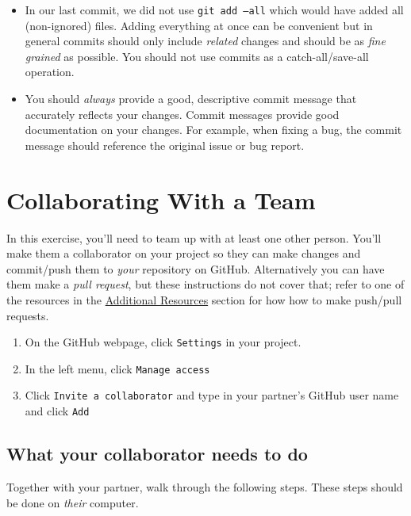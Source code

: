 \documentclass[12pt]{scrartcl}
\begin{document}
\begin{itemize} 
  \item In our last commit, we did not use \texttt{git add --all} 
  which would have added all (non-ignored) files.  Adding everything at once
  can be convenient but in general commits should only include \emph{related}
  changes and should be as \emph{fine grained} as possible.  You should
  not use commits as a catch-all/save-all operation.

  \item You should \emph{always} provide a good, descriptive commit message
  that accurately reflects your changes.  Commit messages provide good
  documentation on your changes.  For example, when fixing a bug, the commit
  message should reference the original issue or bug report.  

\end{itemize}

\section{Collaborating With a Team}

In this exercise, you'll need to team up with at least one other person.
You'll make them a collaborator on your project so they can make changes
and commit/push them to \emph{your} repository on GitHub.  Alternatively
you can have them make a \emph{pull request}, but these instructions do 
not cover that; refer to one of the resources in the 
\hyperref[section:additionalResources]{Additional Resources} section
for how how to make push/pull requests.

\begin{enumerate}
  \item On the GitHub webpage, click \texttt{Settings} in your project.
  \item In the left menu, click \texttt{Manage access}
  \item Click \texttt{Invite a collaborator} and type 
  in your partner's GitHub user name and click \texttt{Add}
\end{enumerate}

\subsection{What your collaborator needs to do}

Together with your partner, walk through the following steps.  These
steps should be done on \emph{their} computer.
\end{document}
